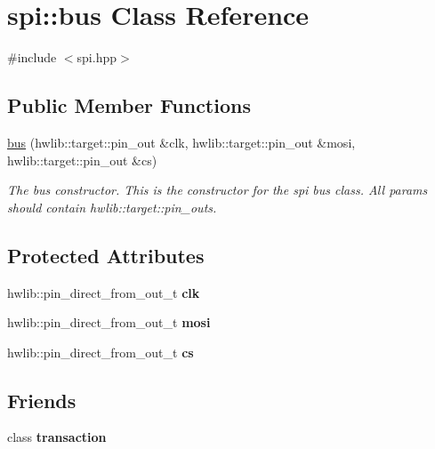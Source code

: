 \hypertarget{classspi_1_1bus}{}\section{spi\+:\+:bus Class Reference}
\label{classspi_1_1bus}


{\ttfamily \#include $<$spi.\+hpp$>$}

\subsection*{Public Member Functions}
\begin{DoxyCompactItemize}
\item 
\hyperlink{classspi_1_1bus_ada40cf5f65fe5e1ca031ac4fb4867ff8}{bus} (hwlib\+::target\+::pin\+\_\+out \&clk, hwlib\+::target\+::pin\+\_\+out \&mosi, hwlib\+::target\+::pin\+\_\+out \&cs)
\begin{DoxyCompactList}\small\item\em The bus constructor. This is the constructor for the spi bus class. All params should contain hwlib\+::target\+::pin\+\_\+out\textquotesingle{}s. \end{DoxyCompactList}\end{DoxyCompactItemize}
\subsection*{Protected Attributes}
\begin{DoxyCompactItemize}
\item 
\mbox{\label{classspi_1_1bus_a8658bfa99180d7816714bdf83afa26f5}} 
hwlib\+::pin\+\_\+direct\+\_\+from\+\_\+out\+\_\+t {\bfseries clk}
\item 
\mbox{\label{classspi_1_1bus_a38993f8e5e6e0442d9385fd0fc95c23f}} 
hwlib\+::pin\+\_\+direct\+\_\+from\+\_\+out\+\_\+t {\bfseries mosi}
\item 
\mbox{\label{classspi_1_1bus_acbfc9351a99e5445a164cca2b76d3727}} 
hwlib\+::pin\+\_\+direct\+\_\+from\+\_\+out\+\_\+t {\bfseries cs}
\end{DoxyCompactItemize}
\subsection*{Friends}
\begin{DoxyCompactItemize}
\item 
\mbox{\label{classspi_1_1bus_afcb110e61ed60a3170c870fc944fb3bf}} 
class {\bfseries transaction}
\end{DoxyCompactItemize}


